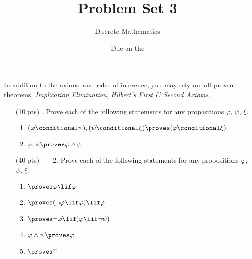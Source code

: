 



\title{Problem Set 3}
\author[Daniel Gonzalez Cedre]{Discrete Mathematics}
\date{Due on the }



\maketitle

In addition to the axioms and rules of inference, you may rely on: all proven theorems, \emph{Implication Elimination}, \emph{Hilbert's First \& Second Axioms}.

\begin{enumerate}
  \item[(10 pts) \quad 1.]
    Prove each of the following statements for any propositions $\varphi$, $\psi$, $\xi$.
    \begin{enumerate}
      \item
        $(\varphi \conditional \psi), (\psi \conditional \xi) \proves (\varphi \conditional \xi)$%
      \item
        $\varphi, \psi \proves \varphi \land \psi$%
    \end{enumerate}
  \item[(40 pts)~~~~2.]
    Prove each of the following statements for any propositions $\varphi$, $\psi$, $\xi$.
    \begin{enumerate}
      \item
        $\proves \varphi \lif \varphi$
      \item
        $\proves (\neg \varphi \lif \varphi) \lif \varphi$%
      \item
        $\proves \neg \varphi \lif (\varphi \lif \neg \psi)$%
      \item
        $\varphi \land \psi \proves \varphi$%
      \item
        $\proves \top$%

\end{enumerate}
\end{enumerate}
